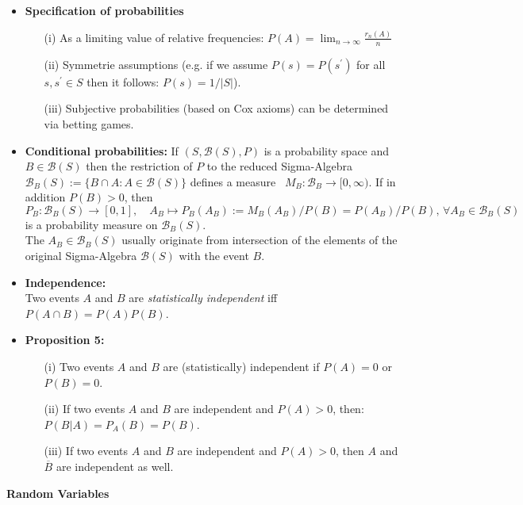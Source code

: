 \documentclass[11pt]{article}
\begin{document}
\begin{itemize}
\item {\bf Specification of probabilities}
\begin{itemize}
\item[(i)] As a limiting value of relative frequencies: $P(A) = \lim_{n\to \infty} \frac{r_n(A)}{n}$
\item[(ii)] Symmetrie assumptions (e.g. if we assume $P(s)=P(s^\prime)$ for all $s,s^\prime \in S$ then it follows: $P(s) = 1/|S|$).
\item[(iii)] Subjective probabilities (based on Cox axioms) can be determined via betting games.
\end{itemize}
\item {\bf Conditional probabilities:}
If $(S,\mathcal{B}(S), P)$ is a probability space and $B \in \mathcal{B}(S)$ then the restriction of $P$ to the reduced Sigma-Algebra $\mathcal{B}_B(S):=\{B\cap A: A \in \mathcal{B}(S)\}$ defines a measure \ $M_B: \mathcal{B}_B \to [0,\infty)$. If in addition $P(B) >0$, then $P_B: \mathcal{B}_B(S) \to [0,1], \quad A_B \mapsto P_B(A_B) :=  M_B(A_B)/P(B)=P(A_B)/P(B), \, \forall A_B \in \mathcal{B}_B(S)$ is a probability measure on $\mathcal{B}_B(S)$.\\
The $A_B\in \mathcal{B}_B(S)$ usually originate from intersection of the elements of the original Sigma-Algebra $\mathcal{B}(S)$ with the event $B$.
\item {\bf Independence:}\\
Two events $A$ and $B$ are {\it statistically independent} iff $P(A\cap B) = P(A) P(B)$.
\item {\bf Proposition 5:} 
\begin{itemize}
\item[(i)] Two events $A$ and $B$ are (statistically) independent if $P(A)=0$ or $P(B)=0$.
\item[(ii)] If two events $A$ and $B$ are independent and $P(A)>0$, then: $P(B|A)=P_A(B)=P(B)$.
\item[(iii)] If two events $A$ and $B$ are independent and $P(A)>0$, then $A$ and $\overline{B}$ are independent as well.
\end{itemize}

\end{itemize}
\begin{center}
{\Large \bf Random Variables}
\end{center}
\end{document}
